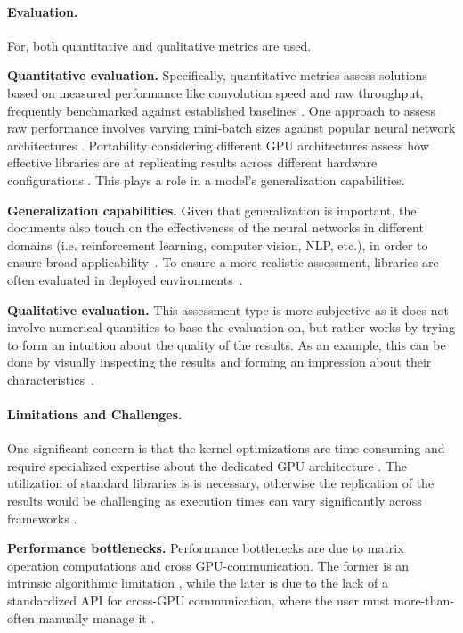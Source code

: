 \paragraph{Evaluation.}
For, both quantitative and qualitative metrics are used.

\textbf{Quantitative evaluation.}
Specifically, quantitative metrics assess solutions based on measured performance like convolution
speed and raw throughput, frequently benchmarked against established baselines
. One approach to assess raw performance involves varying mini-batch sizes
against popular neural network architectures . Portability considering different GPU architectures
assess how effective libraries are at replicating results across different hardware configurations
. This plays a role in a model's generalization capabilities.

\textbf{Generalization capabilities.}
Given that generalization is important, the documents also touch on the effectiveness of the neural
networks in different domains (i.e. reinforcement learning, computer vision, NLP, etc.), in order to
ensure broad applicability~.
To ensure a more realistic assessment, libraries are often evaluated in deployed environments~.

\textbf{Qualitative evaluation.}
This assessment type is more subjective as it does not involve numerical quantities to base the
evaluation on, but rather works by trying to form an intuition about the quality of the results. As
an example, this can be done by visually inspecting the results and forming an impression about
their characteristics~.

\paragraph{Limitations and Challenges.}
One significant concern is that the kernel optimizations are time-consuming and require specialized
expertise about the dedicated GPU architecture . The utilization of standard
libraries is is necessary, otherwise the replication of the results would be challenging as
execution times can vary significantly across frameworks .

\textbf{Performance bottlenecks.}
Performance bottlenecks are due to matrix operation computations and cross GPU-communication. The
former is an intrinsic algorithmic limitation , while the later is due to the
lack of a standardized API for cross-GPU communication, where the user must more-than-often
manually manage it .

